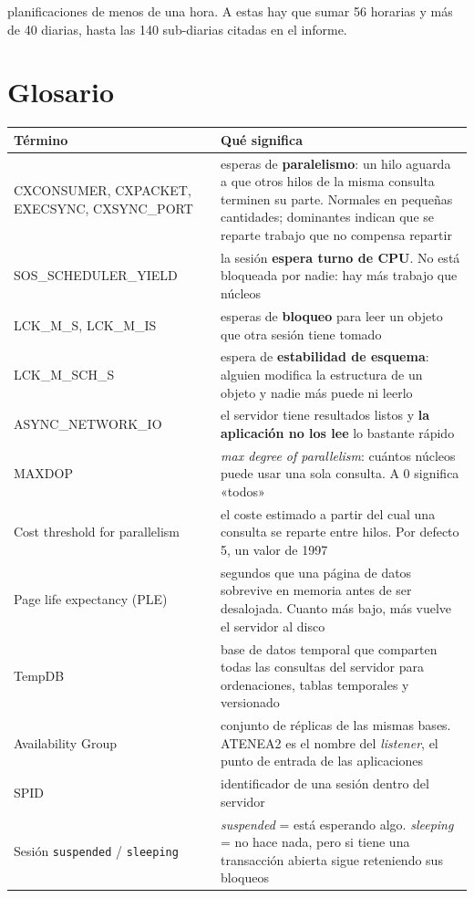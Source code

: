 \documentclass[11pt,a4paper]{article}
\newcommand{\cod}[1]{\texttt{\small #1}}
\begin{document}
 planificaciones de menos de una hora. A estas hay que sumar 56
horarias y más de 40 diarias, hasta las 140 sub-diarias citadas en el informe.

\section{Glosario}

\begin{longtable}{p{4.4cm}p{10.4cm}}
\toprule
\textbf{Término} & \textbf{Qué significa} \\
\midrule
\endhead
CXCONSUMER, CXPACKET, EXECSYNC, CXSYNC\_PORT &
esperas de \textbf{paralelismo}: un hilo aguarda a que otros hilos de la
misma consulta terminen su parte. Normales en pequeñas cantidades;
dominantes indican que se reparte trabajo que no compensa repartir \\
\addlinespace
SOS\_SCHEDULER\_YIELD &
la sesión \textbf{espera turno de CPU}. No está bloqueada por nadie: hay más
trabajo que núcleos \\
\addlinespace
LCK\_M\_S, LCK\_M\_IS &
esperas de \textbf{bloqueo} para leer un objeto que otra sesión tiene tomado \\
\addlinespace
LCK\_M\_SCH\_S &
espera de \textbf{estabilidad de esquema}: alguien modifica la estructura de
un objeto y nadie más puede ni leerlo \\
\addlinespace
ASYNC\_NETWORK\_IO &
el servidor tiene resultados listos y \textbf{la aplicación no los lee} lo
bastante rápido \\
\addlinespace
MAXDOP &
\emph{max degree of parallelism}: cuántos núcleos puede usar una sola
consulta. A 0 significa «todos» \\
\addlinespace
Cost threshold for parallelism &
el coste estimado a partir del cual una consulta se reparte entre hilos. Por
defecto 5, un valor de 1997 \\
\addlinespace
Page life expectancy (PLE) &
segundos que una página de datos sobrevive en memoria antes de ser
desalojada. Cuanto más bajo, más vuelve el servidor al disco \\
\addlinespace
TempDB &
base de datos temporal que comparten todas las consultas del servidor para
ordenaciones, tablas temporales y versionado \\
\addlinespace
Availability Group &
conjunto de réplicas de las mismas bases. ATENEA2 es el nombre del
\emph{listener}, el punto de entrada de las aplicaciones \\
\addlinespace
SPID &
identificador de una sesión dentro del servidor \\
\addlinespace
Sesión \cod{suspended} / \cod{sleeping} &
\emph{suspended} = está esperando algo. \emph{sleeping} = no hace nada, pero
si tiene una transacción abierta sigue reteniendo sus bloqueos \\
\bottomrule
\end{longtable}
\end{document}

